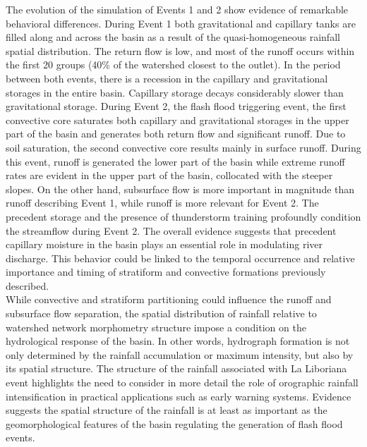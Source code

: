 \documentclass[hess, manuscript]{copernicus}
\begin{document}
The evolution of the simulation of Events 1 and 2 show evidence of remarkable behavioral differences. During Event 1 both gravitational and capillary tanks are filled along and across the basin as a result of the quasi-homogeneous rainfall spatial distribution. The return flow is low, and most of the runoff occurs within the first 20 groups (40\% of the watershed closest to the outlet).   In the period between both events, there is a recession in the capillary and gravitational storages in the entire basin. Capillary storage decays considerably slower than gravitational storage.  During Event 2, the flash flood triggering event,  the first convective core saturates both capillary and gravitational storages in the upper part of the basin and generates both return flow and significant runoff.   Due to soil saturation, the second convective core results mainly in surface runoff. During this event, runoff is generated the lower part of the basin while extreme runoff rates are evident in the upper part of the basin, collocated with the steeper slopes. On the other hand, subsurface flow is more important in magnitude than runoff describing Event 1, while runoff is more relevant for Event 2. The precedent storage and the presence of thunderstorm training profoundly condition the streamflow during Event 2. The overall evidence suggests that precedent capillary moisture in the basin plays an essential role in modulating river discharge. This behavior could be linked to the temporal occurrence and relative importance and timing of stratiform and convective formations previously described. \\

While convective and stratiform partitioning could influence the runoff and subsurface flow separation,  the spatial distribution of rainfall relative to watershed network morphometry structure impose a condition on the hydrological response of the basin. In other words, hydrograph formation is not only determined by the rainfall accumulation or maximum intensity, but also by its spatial structure. The structure of the rainfall associated with La Liboriana event highlights the need to consider in more detail the role of orographic rainfall intensification in practical applications such as early warning systems. Evidence suggests the spatial structure of the rainfall is at least as important as the geomorphological features of the basin regulating the generation of flash flood events.\\
\end{document}
